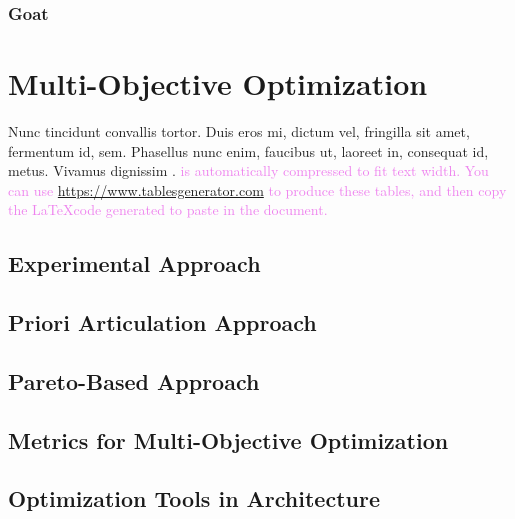 \subsubsection{Goat}
\section{Multi-Objective Optimization}
Nunc tincidunt convallis tortor. Duis eros mi, dictum vel, fringilla sit amet, fermentum id, sem. Phasellus nunc enim, faucibus ut, laoreet in, consequat id, metus. Vivamus dignissim \cite{Moscoso:2011fk}. \textcolor{violet}{ is automatically compressed to fit text width. You can use \url{https://www.tablesgenerator.com} to produce these tables, and then copy the \LaTeX\space code generated to paste in the document.}

\subsection{Experimental Approach}

\subsection{Priori Articulation Approach}

\subsection{Pareto-Based Approach}

\subsection{Metrics for Multi-Objective Optimization}

\subsection{Optimization Tools in Architecture}

